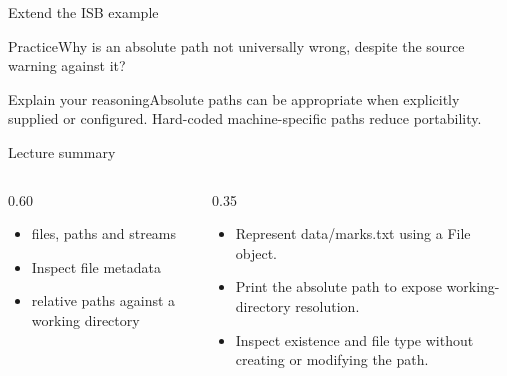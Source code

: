 \documentclass[10pt,aspectratio=169]{beamer}
\begin{document}
\begin{frame}[fragile,t]{Extend the ISB example}
\begin{alertblock}{Practice}Why is an absolute path not universally wrong, despite the source warning against it?\end{alertblock}\vspace{3mm}\begin{exampleblock}{Explain your reasoning}Absolute paths can be appropriate when explicitly supplied or configured. Hard{-}coded machine{-}specific paths reduce portability.\end{exampleblock}
\end{frame}
\begin{frame}[fragile,t]{Lecture summary}
\begin{columns}[T,onlytextwidth]\begin{column}{0.60\textwidth}
\begin{itemize}
\item files, paths and streams
\item Inspect file metadata
\item relative paths against a working directory
\end{itemize}
\end{column}\begin{column}{0.35\textwidth}\small
\begin{itemize}
\item Represent data/marks.txt using a File object.
\item Print the absolute path to expose working-directory resolution.
\item Inspect existence and file type without creating or modifying the path.
\end{itemize}
\end{column}\end{columns}
\end{frame}
\end{document}
